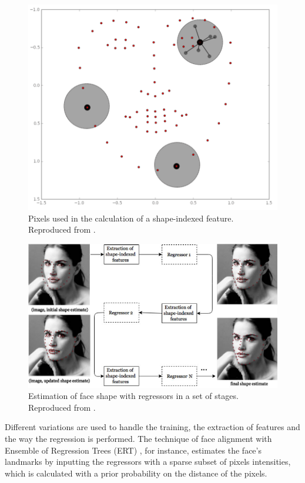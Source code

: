\begin{figure}[h]
    \centering
    \includegraphics[width=0.6\linewidth]{Content/figures/shape-indexed.png}
    \caption{Pixels used in the calculation of a shape-indexed feature. Reproduced from \textcite{maris2015}.}
    \label{fig:shape-indexed}
\end{figure}

\begin{figure}[h]
    \centering
    \includegraphics[width=1.0\linewidth]{Content/figures/cascade-explanation.png}
    \caption{Estimation of face shape with regressors in a set of stages. Reproduced from \textcite{maris2015}.}
    \label{fig:regressor-steps}
\end{figure}

Different variations are used to handle the training, the extraction of features and the way the regression is performed. The technique of face alignment with Ensemble of Regression Trees (ERT) \parencite{kazemi2014one}, for instance, estimates the face's landmarks by inputting the regressors with a sparse subset of pixels intensities, which is calculated with a prior probability on the distance of the pixels.

